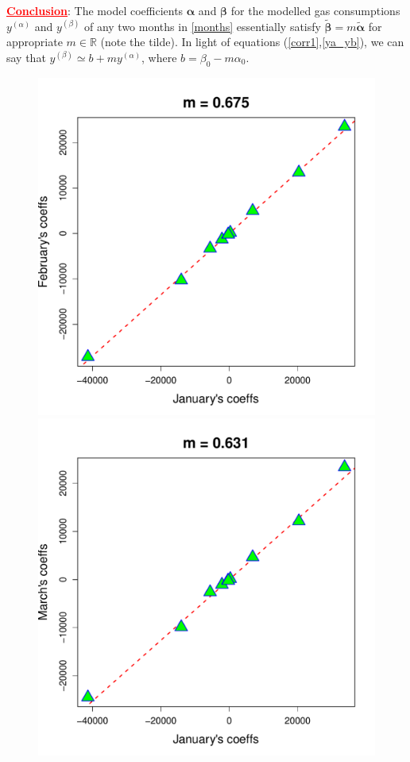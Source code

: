 \documentclass[a4paper, 12pt]{article}
\newcommand{\R}{\mathbb{R}}
\newcommand{\bd}[1]{\boldsymbol{#1}}
\newcommand{\ya}{y^{(\alpha)}}
\newcommand{\yb}{y^{(\beta)}}
\newcommand{\ta}{\bd{\widetilde \alpha}}
\newcommand{\tb}{\bd{\widetilde \beta}}
\begin{document}
\textcolor{red}{\textbf{\underline{Conclusion}}}: The model coefficients $\bd \alpha$ and $\bd \beta$ for the modelled gas consumptions $\ya$ and $\yb$ of any two months in \eqref{months} essentially satisfy $\tb = m\ta$ for appropriate $m\in \R$ (note the tilde). In light of equations (\ref{corr1},\ref{ya_yb}), we can say that $\yb \simeq b + m \ya$, where $b= \beta_0 - m\alpha_0$.




\renewcommand{\scale}{0.443}
\begin{figure}
\centering
 \includegraphics[scale=\scale]{Compare_LRs/LR_Jan_Feb}\hspace{-1ex}
 \includegraphics[scale=\scale]{Compare_LRs/LR_Jan_Mar}\hspace{-1ex}

\end{figure}
\end{document}
